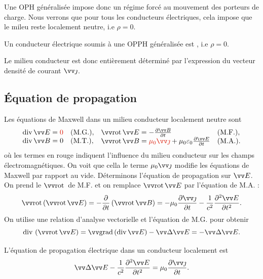 \documentclass[12pt,fancy]{cours}
\begin{document}
Une OPH généralisée impose donc un régime forcé au mouvement des porteurs de charge. Nous verrons que pour tous les conducteurs électriques, cela impose que le mileu reste localement neutre, i.e $\rho=0$.
\begin{prop}\label{prop:}
  Un conducteur électrique soumis à une OPPH généralisée est , i.e $\rho=0$.
\end{prop}
Le milieu conducteur est donc entièrement déterminé par l'expression du vecteur densité de courant $\j$.

\subsection{Équation de propagation}
Les équations de Maxwell dans un milieu conducteur localement neutre sont 
\begin{equation}
  \begin{array}{ll}
    \dive \E = \JRouge{0} & \text{(M.G.)},\\
    \dive \B = 0 & \text{(M.T.)},\\
  \end{array}
  \begin{array}{ll}
    \rot{\E} = -\dr{\B}{t} & \text{(M.F.)},\\
    \rot{\B} = \JRouge{\mu_0\j} + \mu_0\epz\dr{\E}{t} & \text{(M.A.)}.
  \end{array}
\end{equation}
où les termes en rouge indiquent l'influence du milieu conducteur sur les champs électromagnétiques. On voit que cella le terme $\mu_0 \j$ modifie les équations de Maxwell par rapport au vide. Déterminons l'équation de propagation sur $\E$. On prend le $\rot$ de M.F. et on remplace $\rot{\E}$ par l'équation de M.A. :
\begin{equation}
  \rot{\left(\rot{\E}\right)} = -\dr{}{t} \left( \rot \B \right) = -\mu_0\dr{\j}{t}-\frac{1}{c^2}\ddr{\E}{t}.
\end{equation}
On utilise une relation d'analyse vectorielle et l'équation de M.G. pour obtenir
\begin{equation}
  \dive \left(\rot{\E}\right) = \grad{\left(\dive \E\right)}-\Deltav{E} = -\Deltav{E}.
\end{equation}

\begin{theorem}\label{form:propag}
  L'équation de propagation électrique dans un conducteur localement  est  
  $$
\Deltav{E} - \frac{1}{c^2}\ddr{\E}{t} = \mu_0\dr{\j}{t}.
  $$
  \end{theorem}
\end{document}
